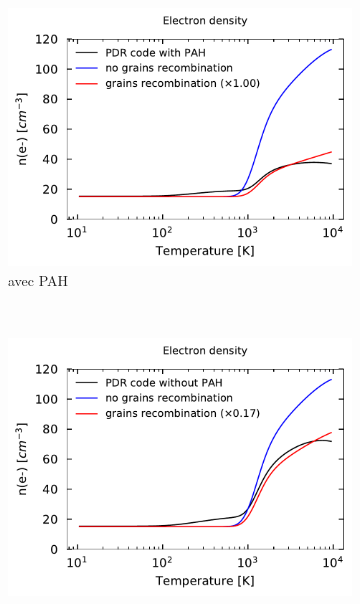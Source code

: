 
\begin{figure}[!h]
    \centering
    \begin{subfigure}[t]{0.49\textwidth} %
        \centering \includegraphics[trim = {0 0 0 1cm},clip,width=1\textwidth]{figure/Cl/test_calc_PAH_e.pdf}
        \caption{avec PAH}
        \label{fig:Cl:model:recPAH}
    \end{subfigure}
    ~ 
    \begin{subfigure}[t]{0.49\textwidth}
        \centering \includegraphics[trim = {0 0 0 1cm},clip,width=1\textwidth]{figure/Cl/test_calc_e.pdf}

\end{subfigure}
\end{figure}
